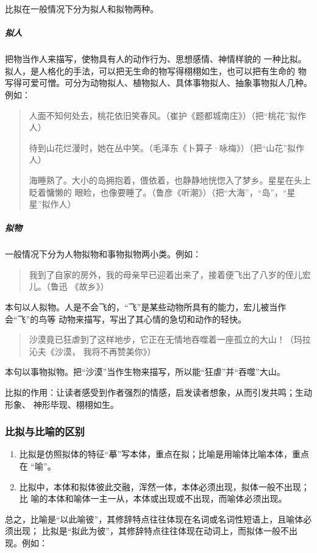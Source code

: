 \documentclass[final,oneside]{ctexbook}
\newenvironment{equotation}{\begin{quotation}\kaishu}{\end{quotation}}
\begin{document}
比拟在一般情况下分为拟人和拟物两种。

\subparagraph{拟人}把物当作人来描写，使物具有人的动作行为、思想感情、神情样貌的
一种比拟。拟人，是人格化的手法，可以把无生命的物写得栩栩如生，也可以把有生命的
物写得可爱可憎。可分为动物拟人、植物拟人、具体事物拟人、抽象事物拟人几种。例如：
\begin{equotation}
  人面不知何处去，桃花依旧笑春风。（崔护《题都城南庄》）（把“桃花”拟作人）

  待到山花烂漫时，她在丛中笑。（毛泽东《卜算子·咏梅》）（把“山花”拟作人）

  海睡熟了。大小的岛拥抱着，偎依着，也静静地恍惚入了梦乡。星星在头上眨着慵懒的
  眼睑，也像要睡了。（鲁彦《听潮》）（把“大海”，“岛”，“星星”拟作人）
\end{equotation}

\subparagraph{拟物}一般情况下分为人物拟物和事物拟物两小类。例如：
\begin{equotation}
  我到了自家的房外，我的母亲早已迎着出来了，接着便飞出了八岁的侄儿宏儿。（鲁迅
  《故乡》）
\end{equotation}
本句以人拟物。人是不会飞的，“飞”是某些动物所具有的能力，宏儿被当作会“飞”的鸟等
动物来描写，写出了其心情的急切和动作的轻快。
\begin{equotation}
  沙漠竟已狂虐到了这样地步，它正在无情地吞噬着一座孤立的大山！（玛拉沁夫《沙漠，
  我将不再赞美你》）
\end{equotation}
本句以事物拟物。把“沙漠”当作生物来描写，所以能“狂虐”并“吞噬”大山。

比拟的作用：让读者感受到作者强烈的情感，启发读者想象，从而引发共鸣；生动形象、
神形毕现、栩栩如生。

\subsubsection{比拟与比喻的区别}

\begin{enumerate}
  \item 比拟是仿照拟体的特征“摹”写本体，重点在拟；比喻是用喻体比喻本体，重点在
    “喻”。

  \item 比拟中，本体和拟体彼此交融，浑然一体，本体必须出现，拟体一般不出现；比
    喻的本体和喻体一主一从，本体或出现或不出现，而喻体必须出现。
\end{enumerate}

总之，比喻是“以此喻彼”，其修辞特点往往体现在名词或名词性短语上，且喻体必须出现；
比拟是“拟此为彼”，其修辞特点往往体现在动词上，而拟体一般不出现。例如：
\end{document}
